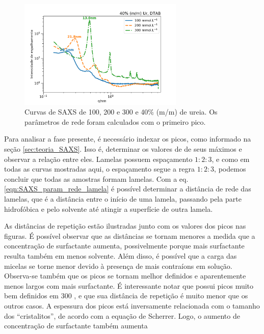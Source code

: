	\begin{figure}[h]
		\centering
		\includegraphics[width=0.7\textwidth]{imagens/saxs/DTAB_conc}
		\caption{Curvas de SAXS de \DTAB{} 100, 200 e 300 \mM{} e 40\% (m/m) de ureia. Os parâmetros de rede foram calculados com o primeiro pico.}
		\label{fig:SAXS_dtabconc}
	\end{figure}
	
	Para analisar a fase presente, é necessário indexar os picos, como informado na seção \ref{sec:teoria_SAXS}. Isso é, determinar os valores de \q{} de seus máximos e observar a relação entre eles. Lamelas possuem espaçamento \(1:2:3\), e como em todas as curvas mostradas aqui, o espaçamento segue a regra \(1:2:3\), podemos concluir que todas as amostras formam lamelas. Com a eq. \ref{eqn:SAXS_param_rede_lamela} é possível determinar a distância de rede das lamelas, que é a distância entre o início de uma lamela, passando pela parte hidrofóbica e pelo solvente até atingir a superfície de outra lamela.
	

	As distâncias de repetição estão ilustradas junto com os valores dos picos nas figuras. É possível observar que as distâncias se tornam menores a medida que a concentração de surfactante aumenta, possivelmente porque mais surfactante resulta também em menos solvente. Além disso, é possível que a carga das micelas se torne menor devido à presença de mais contraíons em solução. Observa-se também que os picos se tornam melhor definidos e aparentemente menos largos com mais surfactante. É interessante notar que \DTAB{} possui picos muito bem definidos em 300 \mM, e que sua distância de repetição é muito menor que os outros casos. A espessura dos picos está inversamente relacionada com o tamanho dos ``cristalitos'', de acordo com a equação de Scherrer. Logo, o aumento de concentração de surfactante também aumenta 

